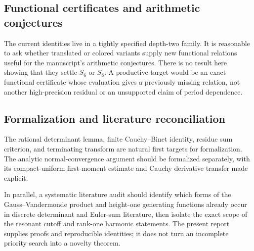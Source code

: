 \subsection{Functional certificates and arithmetic conjectures}
The current identities live in a tightly specified depth-two family.
It is reasonable to ask whether translated or colored variants supply
new functional relations useful for the manuscript's arithmetic
conjectures. There is no result here showing that they settle $S_6$
or $S_8$. A productive target would be an exact functional certificate
whose evaluation gives a previously missing relation, not another
high-precision residual or an unsupported claim of period dependence.

\subsection{Formalization and literature reconciliation}
The rational determinant lemma, finite Cauchy--Binet identity, residue
sum criterion, and terminating transform are natural first targets
for formalization. The analytic normal-convergence argument should
be formalized separately, with its compact-uniform first-moment
estimate and Cauchy derivative transfer made explicit.

In parallel, a systematic literature audit should identify which
forms of the Gauss--Vandermonde product and height-one generating
functions already occur in discrete determinant and Euler-sum
literature, then isolate the exact scope of the resonant cutoff and
rank-one harmonic statements. The present report supplies proofs and
reproducible identities; it does not turn an incomplete priority
search into a novelty theorem.

